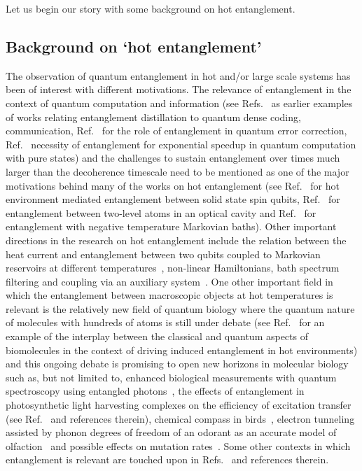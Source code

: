 \documentclass[11pt,a4paper]{article}
\begin{document}
Let us begin our story with some background on hot entanglement. 

\subsection{Background on `hot entanglement'}
    
The observation of quantum entanglement in hot and/or large scale systems has been of interest with different motivations. The relevance of entanglement in the context of quantum computation and information (see Refs.~\cite{densecoding,entg-dist1} as earlier examples of works relating entanglement distillation to quantum dense coding, communication, Ref.~\cite{entg-dist2} for the role of entanglement in quantum error correction, Ref.~\cite{qcomp-exp-spup1} necessity of entanglement for exponential speedup in quantum computation with pure states) and the challenges to sustain entanglement over times much larger than the decoherence timescale need to be mentioned as one of the major motivations behind many of the works on hot entanglement (see Ref.~\cite{qcomp-hotentg1} for hot environment mediated entanglement between solid state spin qubits, Ref.~\cite{qcomp-hotentg2} for entanglement between two-level atoms in an optical cavity and Ref.~\cite{qcomp-negtemp-entg} for entanglement with negative temperature Markovian baths). Other important directions in the research on hot entanglement include the relation between the heat current and entanglement between two qubits coupled to Markovian reservoirs at different temperatures~\cite{qcomp-entg-flow}, non-linear Hamiltonians, bath spectrum filtering and coupling via an auxiliary system~\cite{qcomp-entg-aux}. One other important field in which the entanglement between macroscopic objects at hot temperatures is relevant is the relatively new field of quantum biology where the quantum nature of molecules with hundreds of atoms is still under debate (see Ref.~\cite{qbio-entg-dyn} for an example of the interplay between the classical and quantum aspects of biomolecules in the context of driving induced entanglement in hot environments) and this ongoing debate is promising to open new horizons in molecular biology such as, but not limited to, enhanced biological measurements with quantum spectroscopy using entangled photons~\cite{qbio-entg-meas}, the effects of entanglement in photosynthetic light harvesting complexes on the efficiency of excitation transfer (see Ref.~\cite{qbio-entg-lhc} and references therein), chemical compass in birds~\cite{qbio-entg-comp1,qbio-entg-comp2}, electron tunneling assisted by phonon degrees of freedom of an odorant as an accurate model of olfaction~\cite{qbio-entg-olf1,qbio-entg-olf2} and possible effects on mutation rates~\cite{qbio-entg-mut}. Some other contexts in which entanglement is relevant are touched upon in Refs.~\cite{entrev-horodecki,entg-book1,entg-book2} and references therein.
\end{document}
